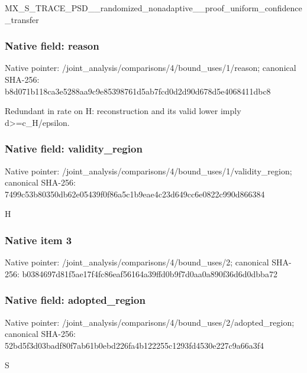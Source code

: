 \documentclass[10pt,a4paper]{article}
\begin{document}
\begingroup\raggedright\sloppy MX\_\allowbreak{}S\_\allowbreak{}TRACE\_\allowbreak{}PSD\_\allowbreak{}\_\allowbreak{}randomized\_\allowbreak{}nonadaptive\_\allowbreak{}\_\allowbreak{}proof\_\allowbreak{}uniform\_\allowbreak{}confidence\_\allowbreak{}transfer\par\endgroup

\subsubsection{Native field: reason}
Native pointer: /joint\_\allowbreak{}analysis/comparisons/4/bound\_\allowbreak{}uses/1/reason; canonical SHA-256: b8d071b118ca3e5288aa9c9e85398761d5ab7fcd0d2d90d678d5e4068411dbc8

\begingroup\raggedright\sloppy Redundant in rate on H:\allowbreak{} reconstruction and its valid lower imply d>=\allowbreak{}c\_\allowbreak{}H/\allowbreak{}epsilon.\par\endgroup

\subsubsection{Native field: validity\_\allowbreak{}region}
Native pointer: /joint\_\allowbreak{}analysis/comparisons/4/bound\_\allowbreak{}uses/1/validity\_\allowbreak{}region; canonical SHA-256: 7499c53b80350db62e05439f0f86a5c1b9eae4c23d649cc6e0822c990d866384

\begingroup\raggedright\sloppy H\par\endgroup

\subsubsection{Native item 3}
Native pointer: /joint\_\allowbreak{}analysis/comparisons/4/bound\_\allowbreak{}uses/2; canonical SHA-256: b0384697d81f5ae17f4fc86eaf56164a39ffd0b9f7d0aa0a890f36d6d0dbba72

\subsubsection{Native field: adopted\_\allowbreak{}region}
Native pointer: /joint\_\allowbreak{}analysis/comparisons/4/bound\_\allowbreak{}uses/2/adopted\_\allowbreak{}region; canonical SHA-256: 52bd5f3d03badf80f7ab61b0ebd226fa4b122255c1293fd4530e227c9a66a3f4

\begingroup\raggedright\sloppy S\par\endgroup
\end{document}
